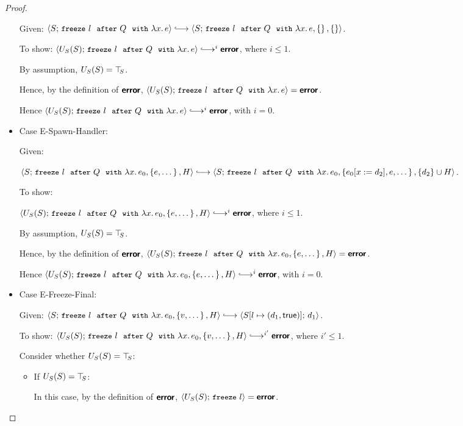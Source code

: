 \begin{proof}
\begin{itemize}
    Given: $\config{S}{\freezeafter{l}{Q}{\lam{x}{e}}} \parstepsto
    \config{S}{\freezeafterfull{l}{Q}{\lam{x}{e}}{\setof{}}{\setof{}}}$.

    To show: $\config{U_S(S)}{\freezeafter{l}{Q}{\lam{x}{e}}}
    \parstepsto^i \error$, where $i \leq 1$.

    By assumption, $U_S(S) = \top\hspace{-0.85mm}_{S}$.

    Hence, by the definition of $\textbf{\textsf{error}}$,
    $\langle U_S(S);\, \mbox{\small{\texttt{freeze}}}~l~~{\mbox{\small{\texttt{after}}}}~Q~~{\mbox{\small{\texttt{with}}}}~\lambda x.\,e \rangle = \textbf{\textsf{error}}$.

    Hence $\config{U_S(S)}{\freezeafter{l}{Q}{\lam{x}{e}}}
    \parstepsto^i \error$, with $i = 0$.

  \item Case {\sc E-Spawn-Handler}:

    Given:

    $\config{S}{\freezeafterfull{l}{Q}{\lam{x}{e_0}}{\setof{e,
          \dots}}{H}} \parstepsto \\
    \config{S}{\freezeafterfull{l}{Q}{\lam{x}{e_0}}{\setof{\subst{e_0}{x}{d_2},
          e, \dots}}{\{d_2\}\cup H}}$.

    To show:

    $\config{U_S(S)}{\freezeafterfull{l}{Q}{\lam{x}{e_0}}{\setof{e,
          \dots}}{H}} \parstepsto^i \error$, where $i \leq 1$.

    By assumption, $U_S(S) = \top\hspace{-0.85mm}_{S}$.

    Hence, by the definition of $\textbf{\textsf{error}}$,
    $\langle U_S(S);\, \mbox{\small{\texttt{freeze}}}~l~~{\mbox{\small{\texttt{after}}}}~Q~~{\mbox{\small{\texttt{with}}}}~\lambda x.\,e_0, \left\{e,
          \dots\right\}, H \rangle = \textbf{\textsf{error}}$.

    Hence
    $\config{U_S(S)}{\freezeafterfull{l}{Q}{\lam{x}{e_0}}{\setof{e,
          \dots}}{H}} \parstepsto^i \error$, with $i = 0$.

  \item Case {\sc E-Freeze-Final}:

    Given:
    $\config{S}{\freezeafterfull{l}{Q}{\lam{x}{e_0}}{\setof{v,
          \dots}}{H}} \parstepsto
    \config{\extS{S}{l}{d_1}{\frozentrue}}{d_1}$.

    To show:
    $\config{U_S(S)}{\freezeafterfull{l}{Q}{\lam{x}{e_0}}{\setof{v,
          \dots}}{H}} \parstepsto^{i'} \error$, where $i' \leq 1$.

    Consider whether $U_S(S) = \top\hspace{-0.85mm}_{S}$:
    \begin{itemize}

    \item If $U_S(S) = \top\hspace{-0.85mm}_{S}$:

      In this case, by the definition of $\textbf{\textsf{error}}$,
      $\langle U_S(S);\, \mbox{\small{\texttt{freeze}}}~l \rangle = \textbf{\textsf{error}}$.


\end{itemize}
\end{itemize}
\end{proof}
